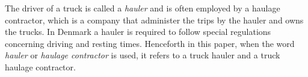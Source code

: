 The driver of a truck is called a \textit{hauler} and is often employed by a haulage contractor, which is a company that administer the trips by the hauler and owns the trucks.
In Denmark a hauler is required to follow special regulations concerning driving and resting times\cite{haulierSleepLaw}.
Henceforth in this paper, when the word \textit{hauler} or \textit{haulage contractor} is used, it refers to a truck hauler and a truck haulage contractor.
